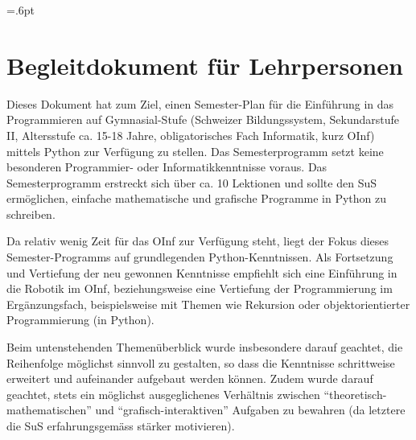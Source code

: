 \fboxsep=.6pt


\section*{Begleitdokument für Lehrpersonen}

Dieses Dokument hat zum Ziel, einen Semester-Plan für die Einführung in das Programmieren auf Gymnasial-Stufe (Schweizer Bildungssystem, Sekundarstufe II, Altersstufe ca. 15-18 Jahre, obligatorisches Fach Informatik, kurz OInf) mittels Python zur Verfügung zu stellen. Das Semesterprogramm setzt keine besonderen Programmier- oder Informatikkenntnisse voraus. Das Semesterprogramm erstreckt sich über ca. 10 Lektionen und sollte den SuS ermöglichen, einfache mathematische und grafische Programme in Python zu schreiben. 

Da relativ wenig Zeit für das OInf zur Verfügung steht, liegt der Fokus dieses Semester-Programms auf grundlegenden Python-Kenntnissen. Als Fortsetzung und Vertiefung der neu gewonnen Kenntnisse empfiehlt sich eine Einführung in die Robotik im OInf, beziehungsweise eine Vertiefung der Programmierung im Ergänzungsfach, beispielsweise mit Themen wie Rekursion oder objektorientierter Programmierung (in Python).

Beim untenstehenden Themenüberblick wurde insbesondere darauf geachtet, die Reihenfolge möglichst sinnvoll zu gestalten, so dass die Kenntnisse schrittweise erweitert und aufeinander aufgebaut werden können. Zudem wurde darauf geachtet, stets ein möglichst ausgeglichenes Verhältnis zwischen ``theoretisch-mathematischen'' und ``grafisch-interaktiven'' Aufgaben zu bewahren (da letztere die SuS erfahrungsgemäss stärker motivieren).

